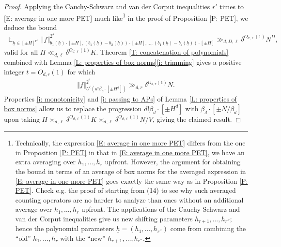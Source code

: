\documentclass[11pt]{amsart}
\theoremstyle{definition}
\DeclareMathOperator*{\E}{\mathbb{E}}
\newcommand{\uh}{{\underline{h}}}
\newcommand{\norm}[1]{\left\Vert #1\right\Vert}
\begin{document}
\begin{proof}
    Applying the Cauchy-Schwarz and van der Corput inequalities $r'$ times to \eqref{E: average in one more PET} much like\footnote{Technically, the expression \eqref{E: average in one more PET} differs from the one in Proposition \ref{P: PET} in that in \eqref{E: average in one more PET}, we have an extra averaging over $h_1, \ldots, h_r$ upfront. However, the argument for obtaining the bound in terms of an average of box norms for the averaged expression in \eqref{E: average in one more PET} goes exactly the same way as in Proposition \ref{P: PET}. Check e.g. the proof of \cite[Corollary 4.3]{Kuc22b} starting from (14) to see why such averaged counting operators are no harder to analyze than ones without an additional average over $h_1, \ldots, h_r$ upfront.
    The applications of the Cauchy-Schwarz and van der Corput inequalities give us new shifting parameters $h_{r+1}, \ldots, h_{r''}$; hence the polynomial parameters $\uh=(h_1, \ldots, h_{r''})$ come from combining the ``old'' $h_1, \ldots, h_r$ with the ``new'' $h_{r+1}, \ldots, h_{r''}$.}  in the proof of Proposition \ref{P: PET}, we deduce the bound
   \begin{align*}
       \E_{\uh\in[\pm H]^{r''}}\norm{f}_{b_1(\uh)\cdot[\pm H], (b_1(\uh)-b_2(\uh))\cdot[\pm H], \ldots, (b_1(\uh)-b_s(\uh))\cdot[\pm H]}^{2^s} \gg_{d, D, \ell} \delta^{O_{d,\ell}(1)}N^D,
   \end{align*}
   valid for all $H\ll_{d,\ell} \delta^{O_{d,\ell}(1)}K$.  Theorem \ref{T: concatenation of polynomials} combined with Lemma \ref{L: properties of box norms}\eqref{i: trimming} gives a positive integer $t=O_{d,r}(1)$ for which
    \begin{align*}
    \norm{f}_{U^t(d!\beta_d\cdot[\pm H^d])}^{2^{t}}\gg_{d,r} \delta^{O_{d,r}(1)} N.
\end{align*}
Properties \eqref{i: monotonicity} and \eqref{i: passing to APs} of Lemma \ref{L: properties of box norms} allow us to replace the progression $d!\beta_d\cdot[\pm H^d]$ with $\beta_d\cdot[\pm N/\beta_d]$ upon taking $H\asymp_{d,\ell} \delta^{O_{d,\ell}(1)}K\asymp_{d,\ell} \delta^{O_{d,\ell}(1)}N/V$, giving the claimed result.

    
\end{proof}













  

\end{document}
